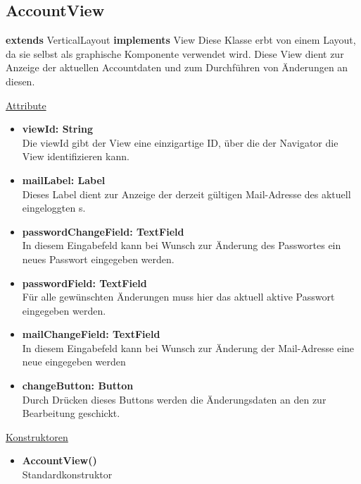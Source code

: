 \newpage
\subsection{AccountView}\label{AccountView}
\textbf{extends}  VerticalLayout \newline
\textbf{implements} View \newline
Diese Klasse erbt von einem Layout, da sie selbst als graphische Komponente verwendet wird. Diese View dient zur Anzeige der aktuellen Accountdaten und zum Durchführen von Änderungen an diesen.
\newline

\underline{Attribute}
\begin{itemize}
\itemsep0pt
\item \textbf{viewId: String} \hfill\\ 
Die viewId gibt der View eine einzigartige ID, über die der Navigator die View identifizieren kann.

\item \textbf{mailLabel: Label} \hfill\\ 
Dieses Label dient zur Anzeige der derzeit gültigen Mail-Adresse des aktuell eingeloggten s.

\item \textbf{passwordChangeField: TextField} \hfill\\ 
In diesem Eingabefeld kann bei Wunsch zur Änderung des Passwortes ein neues Passwort eingegeben werden.

\item \textbf{passwordField: TextField} \hfill\\ 
Für alle gewünschten Änderungen muss hier das aktuell aktive Passwort eingegeben werden.

\item \textbf{mailChangeField: TextField} \hfill\\ 
In diesem Eingabefeld kann bei Wunsch zur Änderung der Mail-Adresse eine neue eingegeben werden

\item \textbf{changeButton: Button} \hfill\\
Durch Drücken dieses Buttons werden die Änderungsdaten an den  zur Bearbeitung geschickt.
\end{itemize}

\underline{Konstruktoren}
\begin{itemize}
\itemsep0pt
\item \textbf{AccountView()} \hfill\\
Standardkonstruktor
\end{itemize}



